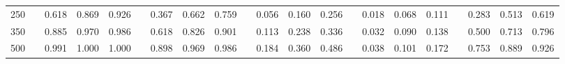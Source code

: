 % 
\begin{tabular}{ccccccccccccccccccccc}
  \hline
  \hline
250 &  & 0.618 & 0.869 & 0.926 &  & 0.367 & 0.662 & 0.759 &  & 0.056 & 0.160 & 0.256 &  & 0.018 & 0.068 & 0.111 &  & 0.283 & 0.513 & 0.619 \\ 
  350 &  & 0.885 & 0.970 & 0.986 &  & 0.618 & 0.826 & 0.901 &  & 0.113 & 0.238 & 0.336 &  & 0.032 & 0.090 & 0.138 &  & 0.500 & 0.713 & 0.796 \\ 
  500 &  & 0.991 & 1.000 & 1.000 &  & 0.898 & 0.969 & 0.986 &  & 0.184 & 0.360 & 0.486 &  & 0.038 & 0.101 & 0.172 &  & 0.753 & 0.889 & 0.926 \\ 
   \hline
\end{tabular}
